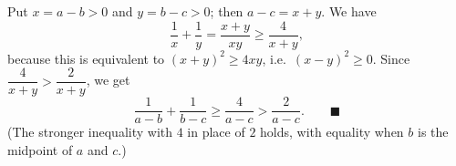 Put $x=a-b>0$ and $y=b-c>0$; then $a-c=x+y$. We have
\[
\dfrac{1}{x}+\dfrac{1}{y}=\dfrac{x+y}{xy}\ge\dfrac{4}{x+y},
\]
because this is equivalent to $(x+y)^2\ge4xy$, i.e.\ $(x-y)^2\ge0$. Since $\dfrac{4}{x+y}>\dfrac{2}{x+y}$, we get
\[
\dfrac{1}{a-b}+\dfrac{1}{b-c}\ge\dfrac{4}{a-c}>\dfrac{2}{a-c}. \qquad\blacksquare
\]
(The stronger inequality with $4$ in place of $2$ holds, with equality when $b$ is the midpoint of $a$ and $c$.)
